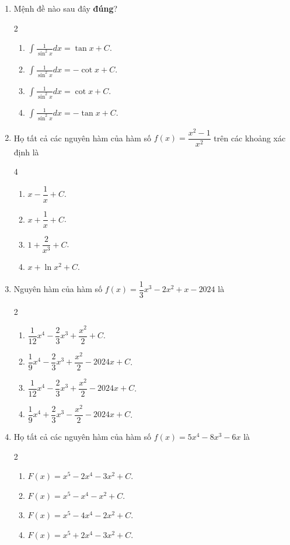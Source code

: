 \documentclass[12pt]{article}
\begin{document}
\begin{enumerate}[label=\textbf{Câu \arabic*.}]
		\item Mệnh đề nào sau đây \textbf{đúng}?
		\begin{multicols}{2}
			\begin{enumerate}[label=\textbf{\Alph*.}]
				\item $\displaystyle \int \frac{1}{\sin^2 x} dx = \tan x + C$.
				\item $\displaystyle \int \frac{1}{\sin^2 x} dx = -\cot x + C$.
				\item $\displaystyle \int \frac{1}{\sin^2 x} dx = \cot x + C$.
				\item $\displaystyle \int \frac{1}{\sin^2 x} dx = -\tan x + C$.
			\end{enumerate}
		\end{multicols}
		
		\item Họ tất cả các nguyên hàm của hàm số $f(x) = \dfrac{x^2 - 1}{x^2}$ trên các khoảng xác định là
		\begin{multicols}{4}
			\begin{enumerate}[label=\textbf{\Alph*.}]
				\item $x - \dfrac{1}{x} + C$.
				\item $x + \dfrac{1}{x} + C$.
				\item $1 + \dfrac{2}{x^3} + C$.
				\item $x + \ln x^2 + C$.
			\end{enumerate}
		\end{multicols}
		
		\item Nguyên hàm của hàm số $f(x) = \dfrac{1}{3}x^3 - 2x^2 + x - 2024$ là
		\begin{multicols}{2}
			\begin{enumerate}[label=\textbf{\Alph*.}]
				\item $\dfrac{1}{12}x^4 - \dfrac{2}{3}x^3 + \dfrac{x^2}{2} + C$.
				\item $\dfrac{1}{9}x^4 - \dfrac{2}{3}x^3 + \dfrac{x^2}{2} - 2024x + C$.
				\item $\dfrac{1}{12}x^4 - \dfrac{2}{3}x^3 + \dfrac{x^2}{2} - 2024x + C$.
				\item $\dfrac{1}{9}x^4 + \dfrac{2}{3}x^3 - \dfrac{x^2}{2} - 2024x + C$.
			\end{enumerate}
		\end{multicols}
		
		\item Họ tất cả các nguyên hàm của hàm số $f(x) = 5x^4 - 8x^3 - 6x$ là
		\begin{multicols}{2}
			\begin{enumerate}[label=\textbf{\Alph*.}]
				\item $F(x) = x^5 - 2x^4 - 3x^2 + C$.
				\item $F(x) = x^5 - x^4 - x^2 + C$.
				\item $F(x) = x^5 - 4x^4 - 2x^2 + C$.
				\item $F(x) = x^5 + 2x^4 - 3x^2 + C$.
			\end{enumerate}
		\end{multicols}
		

\end{enumerate}
\end{document}
